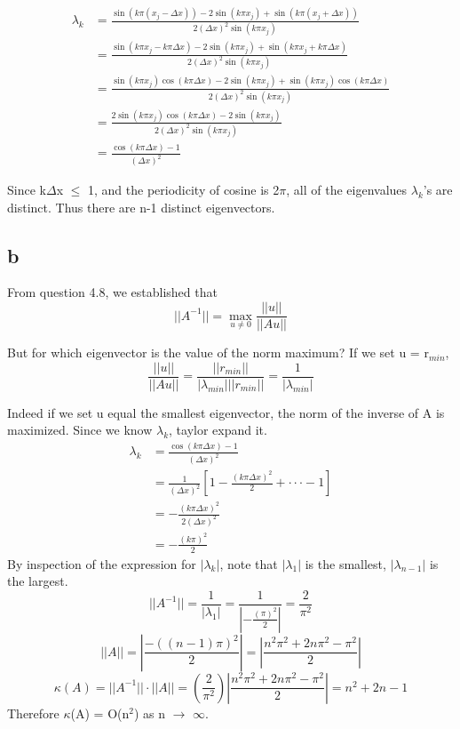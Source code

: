 \documentclass[11pt]{amsart}
\begin{document}
\begin{align*}
\lambda_{k} &= \frac{\sin(k\pi(x_{j} - \Delta x)) - 2\sin(k\pi x_{j}) + \sin(k\pi(x_{j}+\Delta x))}{2(\Delta x)^2\sin(k\pi x_{j})}\\
&= \frac{\sin(k\pi x_{j}-k \pi \Delta x)-2\sin(k\pi x_{j})+\sin(k\pi x_{j}+k \pi \Delta x)}{2(\Delta x)^2\sin(k\pi x_{j})}\\
&= \frac{\sin(k\pi x_{j})\cos(k\pi \Delta x)-2\sin(k\pi x_{j}) + \sin(k\pi x_{j})\cos(k\pi \Delta x)}{2(\Delta x)^2\sin(k\pi x_{j})}\\
&= \frac{2\sin(k\pi x_{j})\cos(k\pi \Delta x)-2\sin(k\pi x_{j})}{2(\Delta x)^2\sin(k\pi x_{j})}\\
&= \frac{\cos(k\pi \Delta x)-1}{(\Delta x)^2}
\end{align*}

Since k$\Delta$x  $\le$ 1, and the periodicity of cosine is 2$\pi$, all of the eigenvalues $\lambda$$_{k}$'s are distinct. Thus there are n-1 distinct eigenvectors.

\subsection*{b}
From question 4.8, we established that 
\[
||A^{-1}|| = \max_{u \ne 0}{\frac{||u||}{||Au||}}
\]

But for which eigenvector is the value of the norm maximum? If we set u = r$_{min}$,
\[
\frac{||u||}{||Au||} = \frac{||r_{min}||}{|\lambda_{min}| ||r_{min}||}
= \frac{1}{|\lambda_{min}|}
\]

Indeed if we set u equal the smallest eigenvector, the norm of the inverse of A is maximized. Since we know $\lambda$$_{k}$, taylor expand it.
\begin{align*}
\lambda_{k} &= \frac{\cos(k\pi \Delta x)-1}{(\Delta x)^2}\\
&= \frac{1}{(\Delta x)^2} [1- \frac{(k\pi \Delta x)^2}{2}+ \cdot \cdot \cdot -1]\\
&= -\frac{(k\pi \Delta x)^2}{2(\Delta x)^2}\\
&= -\frac{(k\pi)^2}{2}
\end{align*}
By inspection of the expression for $|$$\lambda$$_{k}$$|$, note that $|$$\lambda$$_{1}$$|$ is the smallest, $|$$\lambda$$_{n-1}$$|$ is the largest.
\[
||A^{-1}|| = \frac{1}{|\lambda_{1}|}= \frac{1}{|-\frac{(\pi)^2}{2}|}=\frac{2}{\pi^2}
\]
\[
||A|| = |\frac{-((n-1)\pi)^2}{2}| = |\frac{n^2 \pi^2+2n\pi^2-\pi^2}{2}|
\]
\[\kappa(A) = ||A^{-1}||\cdot||A|| = (\frac{2}{\pi^2}) |\frac{n^2 \pi^2+2n\pi^2-\pi^2}{2}| = n^{2}+2n-1
\]
Therefore $\kappa$(A) = O(n$^{2}$) as n $\to$ $\infty$. 
\newline
\newline
\end{document}
